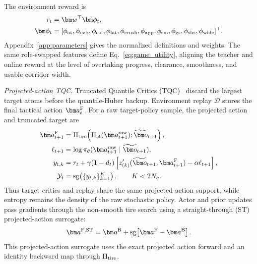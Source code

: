 \documentclass[sensors,article,submit,moreauthors]{Definitions/mdpi}
\begin{document}
The environment reward is
\begin{equation}
\begin{aligned}
r_t&=\bm w^\top\bm\phi_t,\\
\bm\phi_t&=[\phi_{\rm ot},\phi_{\rm ovb},\phi_{\rm col},\phi_{\rm lat},
\phi_{\rm crush},\phi_{\rm app},
\phi_{\rm sm},\phi_{\rm gs},\phi_{\rm sbs},
\phi_{\rm wide}]^\top .
\end{aligned}
\label{eq:reward_sum}
\end{equation}
Appendix~\ref{app:parameters} gives the normalized definitions and weights.
The same role-swapped features define Eq.~\eqref{eq:game_utility}, aligning the
teacher and online reward at the level of overtaking progress, clearance,
smoothness, and usable corridor width.

\emph{Projected-action TQC.} Truncated Quantile Critics
(TQC)~\cite{kuznetsov2020tqc} discard the largest
target atoms before the quantile-Huber backup. Environment replay $\mathcal D$
stores the final tactical action $\bm a_t^{\rm F}$. For a raw target-policy
sample, the projected action and truncated target are
\begin{equation}
\begin{aligned}
\bm a_{t+1}^{\rm F}&=\Pi_{\rm tire}\!\left(
\Pi_{\mathcal A}(\bm a_{t+1}^{\rm raw});
\widetilde{\bm o}_{t+1}\right),\\
\ell_{t+1}&=\log\pi_\theta(\bm a_{t+1}^{\rm raw}
\mid\widetilde{\bm o}_{t+1}),\\
y_{t,k}&=r_t+\gamma(1-d_t)
\left[z_{(k)}'(\widetilde{\bm o}_{t+1},\bm a_{t+1}^{\rm F})
-\alpha\ell_{t+1}\right],\\
\mathcal Y_t&=\operatorname{sg}\!\left(\{y_{t,k}\}_{k=1}^{K}\right),
\qquad K<2N_q .
\end{aligned}
\label{eq:tqc_truncated_target}
\end{equation}
Thus target critics and replay share the same projected-action support, while
entropy remains the density of the raw stochastic policy. Actor and prior
updates pass gradients through the non-smooth tire search using a
straight-through (ST) projected-action surrogate:
\begin{equation}
\bm a^{\rm F,ST}=\bm a^{\rm B}
+\operatorname{sg}\!\left[\bm a^{\rm F}-\bm a^{\rm B}\right].
\label{eq:tire_projection_ste}
\end{equation}
This projected-action surrogate uses the exact projected action forward and an
identity backward map through $\Pi_{\rm tire}$.
\end{document}
